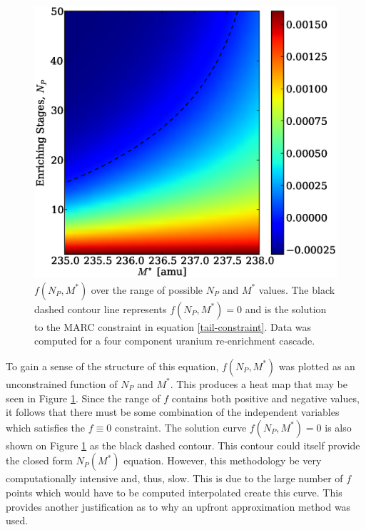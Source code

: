 \documentclass{ansconf}
\begin{document}
\begin{figure}[htpb]
\begin{center}
\includegraphics[scale=0.5]{np_constraint.eps}
\caption{$f(N_P, M^*)$ over the range of possible $N_P$ and $M^*$ values.  The black
dashed contour line represents $f(N_P, M^*)=0$ and is the solution to the MARC 
constraint in equation \ref{tail-constraint}. 
Data was computed for a four component uranium re-enrichment cascade.}
\label{np_constraint_fig}
\end{center}
\end{figure}

To gain a sense of the structure of this equation, $f(N_P,M^*)$ was plotted as an 
unconstrained function of $N_P$ and $M^*$.
This produces a heat map that may be seen in Figure \ref{np_constraint_fig}.  
Since the range of $f$ contains both positive and negative
values, it follows that there must be some combination of the independent variables 
which satisfies the $f\equiv 0$ constraint.  The solution curve $f(N_P, M^*)=0$ is 
also shown on Figure \ref{np_constraint_fig} as the black dashed contour.  
This contour could itself provide the closed form $N_P(M^*)$ equation.
However, this methodology be very computationally intensive and, thus, slow.  
This is due to the large number of $f$ points which would have to be 
computed interpolated create this curve.  This provides another justification as to 
why an upfront approximation method was used.
\end{document}
